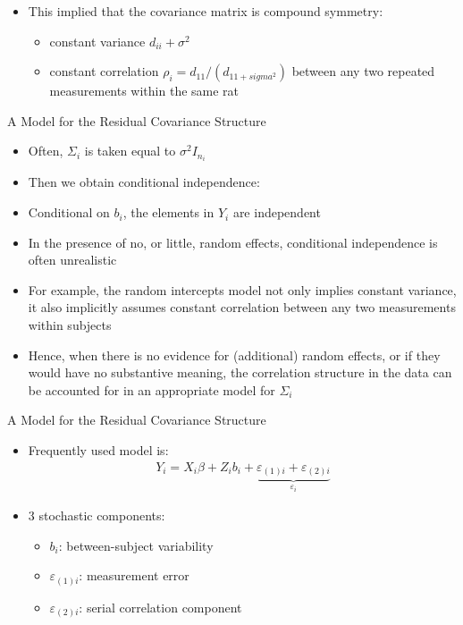 \documentclass{beamer}
\begin{document}
\begin{frame}
\begin{itemize}
\item This implied that the covariance matrix is compound symmetry:
\begin{itemize}
\item constant variance $d_{ii}+\sigma^2$
\item constant correlation $\rho_i=d_{11}/(d_{11+sigma^2})$ between any two repeated measurements within the same rat
\end{itemize}
\end{itemize}
\end{frame}


\begin{frame}{A Model for the Residual Covariance Structure}
\begin{itemize}
\item Often, $\Sigma_i$ is taken equal to $\sigma^2I_{n_i}$
\item Then we obtain conditional independence:
\item Conditional on $b_i$, the elements in $Y_i$ are independent
\item In the presence of no, or little, random effects, conditional independence is often unrealistic
\item For example, the random intercepts model not only implies constant variance, it also implicitly assumes constant correlation between any two measurements within subjects
\item Hence, when there is no evidence for (additional) random effects, or if they would have no substantive meaning, the correlation structure in the data can be accounted for in an appropriate model for $\Sigma_i$
\end{itemize}
\end{frame}

\begin{frame}{A Model for the Residual Covariance Structure}
\begin{itemize}
\item Frequently used model is:
\begin{eqnarray*}
Y_{i} = X_i\beta +Z_ib_i+\underbrace{\varepsilon_{(1)i}+\varepsilon_{(2)i}}_{\varepsilon_{i}} 
\end{eqnarray*}
\item 3 stochastic components: \vspace{0.25cm}
\begin{itemize}
\item  $b_i$: between-subject variability  \vspace{0.25cm}
\item  $\varepsilon_{(1)i}$: measurement error  \vspace{0.25cm}
\item  $\varepsilon_{(2)i}$: serial correlation component
\end{itemize}
\end{itemize}
\end{frame}
\end{document}
